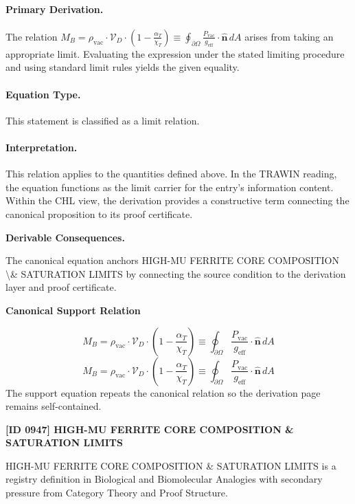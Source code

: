 \paragraph{Primary Derivation.}
The relation \( M_B = \rho_{\text{vac}} \cdot \mathcal{V}_D \cdot \left( 1 - \frac{\alpha_T}{\chi_T} \right) \equiv \oint_{\partial \Omega} \frac{P_{\text{vac}}}{g_{\text{eff}}} \cdot \hat{\mathbf{n}} \, dA \) arises from taking an appropriate limit. Evaluating the expression under the stated limiting procedure and using standard limit rules yields the given equality.
\paragraph{Equation Type.}
This statement is classified as a limit relation.

\paragraph{Interpretation.}
This relation applies to the quantities defined above. In the TRAWIN reading, the equation functions as the limit carrier for the entry’s information content. Within the CHL view, the derivation provides a constructive term connecting the canonical proposition to its proof certificate.

\par\vspace{0.35em}
\noindent\textbf{Derivable Consequences.}\quad
\begingroup
\footnotesize
\raggedright
The canonical equation anchors HIGH-MU FERRITE CORE COMPOSITION \textbackslash{}\& SATURATION LIMITS by connecting the source condition to the derivation layer and proof certificate.
\par\endgroup

\noindent\textbf{Canonical Support Relation}\par
\[
M_B = \rho_{\text{vac}} \cdot \mathcal{V}_D \cdot \left( 1 - \frac{\alpha_T}{\chi_T} \right) \equiv \oint_{\partial \Omega} \frac{P_{\text{vac}}}{g_{\text{eff}}} \cdot \hat{\mathbf{n}} \, dA
\]
\[
M_B = \rho_{\text{vac}} \cdot \mathcal{V}_D \cdot \left( 1 - \frac{\alpha_T}{\chi_T} \right) \equiv \oint_{\partial \Omega} \frac{P_{\text{vac}}}{g_{\text{eff}}} \cdot \hat{\mathbf{n}} \, dA
\]
\noindent The support equation repeats the canonical relation so the derivation page remains self-contained.\par

\clearpage
\noindent\textbf{[ID 0947] HIGH-MU FERRITE CORE COMPOSITION \& SATURATION LIMITS}\par
\vspace{0.35em}
\begingroup\small
{}
HIGH-MU FERRITE CORE COMPOSITION \& SATURATION LIMITS is a registry definition in Biological and Biomolecular Analogies with secondary pressure from Category Theory and Proof Structure.

